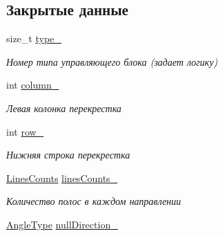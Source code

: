 \subsection*{Закрытые данные}
\begin{DoxyCompactItemize}
\item 
\mbox{\label{classrtm_1_1_control_unit_a831ba648d8df6aca6c2530bab19eae65}} 
size\+\_\+t \hyperlink{classrtm_1_1_control_unit_a831ba648d8df6aca6c2530bab19eae65}{type\+\_\+}
\begin{DoxyCompactList}\small\item\em Номер типа управляющего блока (задает логику) \end{DoxyCompactList}\item 
\mbox{\label{classrtm_1_1_control_unit_a9b3fa03f97a3f29e758e265c8ded4957}} 
int \hyperlink{classrtm_1_1_control_unit_a9b3fa03f97a3f29e758e265c8ded4957}{column\+\_\+}
\begin{DoxyCompactList}\small\item\em Левая колонка перекрестка \end{DoxyCompactList}\item 
\mbox{\label{classrtm_1_1_control_unit_aa3b238e5b91281a493bfb3fb24d01d66}} 
int \hyperlink{classrtm_1_1_control_unit_aa3b238e5b91281a493bfb3fb24d01d66}{row\+\_\+}
\begin{DoxyCompactList}\small\item\em Нижняя строка перекрестка \end{DoxyCompactList}\item 
\mbox{\label{classrtm_1_1_control_unit_a98e098f07ff00685089fa55f0b569802}} 
\hyperlink{namespacertm_a14457f3088a92b86a96686b72d3e4eea}{Lines\+Counts} \hyperlink{classrtm_1_1_control_unit_a98e098f07ff00685089fa55f0b569802}{lines\+Counts\+\_\+}
\begin{DoxyCompactList}\small\item\em Количество полос в каждом направлении \end{DoxyCompactList}\item 
\mbox{\label{classrtm_1_1_control_unit_a2fe9307cb649d9c6a7f122e0363bca24}} 
\hyperlink{namespacertm_a69dc82b16a0148c10962caa83d930f89}{Angle\+Type} \hyperlink{classrtm_1_1_control_unit_a2fe9307cb649d9c6a7f122e0363bca24}{null\+Direction\+\_\+}

\end{DoxyCompactItemize}
